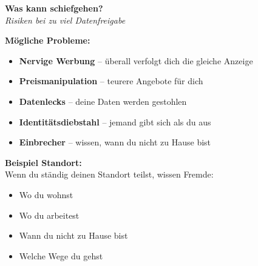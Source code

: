 \documentclass[a4paper,landscape,8pt]{extarticle}
\begin{document}
\hfill%
\begin{minipage}[t]{0.32\linewidth}
\begin{center}
\colorbox{warnred!10}{%
\begin{minipage}{0.95\linewidth}
\vspace{2mm}
\begin{center}
{\Large\bfseries\textcolor{warnred}{Was kann schiefgehen?}}\\[1pt]
{\footnotesize\itshape Risiken bei zu viel Datenfreigabe}
\end{center}
\vspace{2mm}
\end{minipage}%
}
\end{center}

\vspace{1mm}

\textbf{Mögliche Probleme:}
\begin{itemize}
\item \textbf{Nervige Werbung} -- überall verfolgt dich die gleiche Anzeige
\item \textbf{Preismanipulation} -- teurere Angebote für dich
\item \textbf{Datenlecks} -- deine Daten werden gestohlen
\item \textbf{Identitätsdiebstahl} -- jemand gibt sich als du aus
\item \textbf{Einbrecher} -- wissen, wann du nicht zu Hause bist
\end{itemize}

\vspace{2mm}

\textbf{Beispiel Standort:}\\
Wenn du ständig deinen Standort teilst, wissen Fremde:
\begin{itemize}
\item Wo du wohnst
\item Wo du arbeitest
\item Wann du nicht zu Hause bist
\item Welche Wege du gehst
\end{itemize}

\vspace{2mm}

\begin{center}
\end{center}

\end{minipage}
\end{document}
